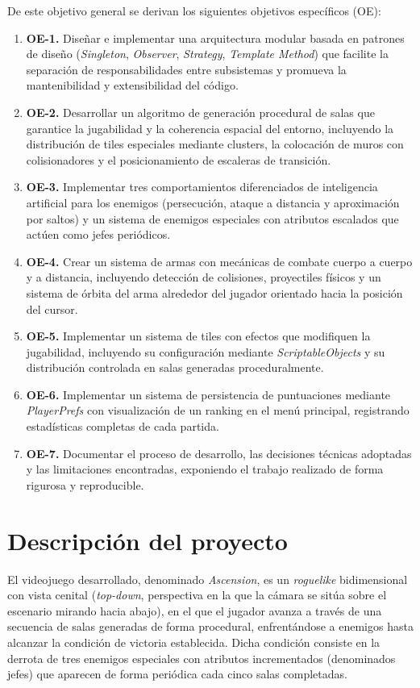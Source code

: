 De este objetivo general se derivan los siguientes objetivos específicos (OE):

\begin{enumerate}
\item \textbf{OE-1.} Diseñar e implementar una arquitectura modular basada en patrones de diseño (\textit{Singleton}, \textit{Observer}, \textit{Strategy}, \textit{Template Method}) que facilite la separación de responsabilidades entre subsistemas y promueva la mantenibilidad y extensibilidad del código.
\item \textbf{OE-2.} Desarrollar un algoritmo de generación procedural de salas que garantice la jugabilidad y la coherencia espacial del entorno, incluyendo la distribución de tiles especiales mediante clusters, la colocación de muros con colisionadores y el posicionamiento de escaleras de transición.
\item \textbf{OE-3.} Implementar tres comportamientos diferenciados de inteligencia artificial para los enemigos (persecución, ataque a distancia y aproximación por saltos) y un sistema de enemigos especiales con atributos escalados que actúen como jefes periódicos.
\item \textbf{OE-4.} Crear un sistema de armas con mecánicas de combate cuerpo a cuerpo y a distancia, incluyendo detección de colisiones, proyectiles físicos y un sistema de órbita del arma alrededor del jugador orientado hacia la posición del cursor.
\item \textbf{OE-5.} Implementar un sistema de tiles con efectos que modifiquen la jugabilidad, incluyendo su configuración mediante \textit{ScriptableObjects} y su distribución controlada en salas generadas proceduralmente.
\item \textbf{OE-6.} Implementar un sistema de persistencia de puntuaciones mediante \textit{PlayerPrefs} con visualización de un ranking en el menú principal, registrando estadísticas completas de cada partida.
\item \textbf{OE-7.} Documentar el proceso de desarrollo, las decisiones técnicas adoptadas y las limitaciones encontradas, exponiendo el trabajo realizado de forma rigurosa y reproducible.
\end{enumerate}

\section{Descripción del proyecto}


El videojuego desarrollado, denominado \textit{Ascension}, es un \textit{roguelike} bidimensional con vista cenital (\textit{top-down}, perspectiva en la que la cámara se sitúa sobre el escenario mirando hacia abajo), en el que el jugador avanza a través de una secuencia de salas generadas de forma procedural, enfrentándose a enemigos hasta alcanzar la condición de victoria establecida. Dicha condición consiste en la derrota de tres enemigos especiales con atributos incrementados (denominados jefes) que aparecen de forma periódica cada cinco salas completadas.

